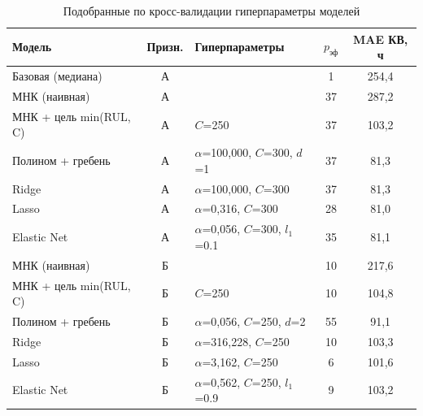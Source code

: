 \begin{table}[H]
\centering
\small
\setlength{\tabcolsep}{3pt}
\caption{Подобранные по кросс-валидации гиперпараметры моделей}\label{tab:hyper}
\begin{tabular}{>{\raggedright\arraybackslash}p{2.7cm}c>{\raggedright\arraybackslash}p{3.3cm}cc}
\toprule
Модель & Призн. & Гиперпараметры & $p_{\text{эф}}$ & MAE КВ, ч \\
\midrule
Базовая (медиана) & А &  & 1 & 254,4 \\
МНК (наивная) & А &  & 37 & 287,2 \\
МНК + цель min(RUL, C) & А & $C$=250 & 37 & 103,2 \\
Полином + гребень & А & $\alpha$=100,000, $C$=300, $d$=1 & 37 & 81,3 \\
Ridge & А & $\alpha$=100,000, $C$=300 & 37 & 81,3 \\
Lasso & А & $\alpha$=0,316, $C$=300 & 28 & 81,0 \\
Elastic Net & А & $\alpha$=0,056, $C$=300, $l_1$=0.1 & 35 & 81,1 \\
МНК (наивная) & Б &  & 10 & 217,6 \\
МНК + цель min(RUL, C) & Б & $C$=250 & 10 & 104,8 \\
Полином + гребень & Б & $\alpha$=0,056, $C$=250, $d$=2 & 55 & 91,1 \\
Ridge & Б & $\alpha$=316,228, $C$=250 & 10 & 103,3 \\
Lasso & Б & $\alpha$=3,162, $C$=250 & 6 & 101,6 \\
Elastic Net & Б & $\alpha$=0,562, $C$=250, $l_1$=0.9 & 9 & 103,2 \\
\bottomrule
\end{tabular}
\end{table}